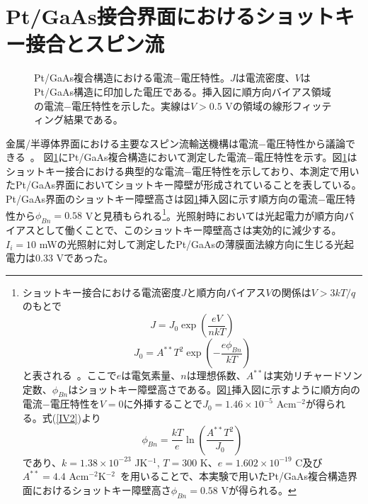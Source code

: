 \section{Pt/GaAs接合界面におけるショットキー接合とスピン流}






\begin{figure}[tbp]
\begin{center}
\caption{Pt/GaAs複合構造における電流−電圧特性。$J$は電流密度、$V$はPt/GaAs構造に印加した電圧である。挿入図に順方向バイアス領域の電流−電圧特性を示した。実線は$V>0.5$ Vの領域の線形フィッティング結果である。}
\label{current_voltage} 
\end{center}
\end{figure}


金属/半導体界面における主要なスピン流輸送機構は電流−電圧特性から議論できる~\cite{Padovani,Cohen,Sze}。
図\ref{current_voltage}にPt/GaAs複合構造において測定した電流−電圧特性を示す。図\ref{current_voltage}はショットキー接合における典型的な電流−電圧特性を示しており、本測定で用いたPt/GaAs界面においてショットキー障壁が形成されていることを表している。
Pt/GaAs界面のショットキー障壁高さは図\ref{current_voltage}挿入図に示す順方向の電流−電圧特性から$\phi_{Bn}=0.58$ Vと見積もられる\footnote{ショットキー接合における電流密度$J$と順方向バイアス$V$の関係は$V>3kT/q$のもとで
\begin{equation}
J=J_0\exp\left(\frac{eV}{nkT}\right)\label{IV}
\end{equation}
\begin{equation}
J_0=A^{**}T^2\exp \left(-\frac{e\phi_{Bn}}{kT}\right)\label{IV2}
\end{equation}
と表される~\cite{Sze,Cohen}。ここで$e$は電気素量、$n$は理想係数、$A^{**}$は実効リチャードソン定数、$\phi_{Bn}$はショットキー障壁高さである。図\ref{current_voltage}挿入図に示すように順方向の電流−電圧特性を$V=0$に外挿することで$J_0=1.46\times10^{-5}$ Acm$^{-2}$が得られる。式(\ref{IV2})より
\begin{equation}
\phi_{Bn}=\frac{kT}{e}\ln\left(\frac{A^{**}T^2}{J_0}\right)
\end{equation}
であり、$k=1.38\times10^{-23}$ JK$^{-1}$, $T=300$ K、$e=1.602\times 10^{-19}$ C及び$A^{**}=4.4$ Acm$^{-2}$K$^{-2}$~\cite{Sze}を用いることで、本実験で用いたPt/GaAs複合構造界面におけるショットキー障壁高さ$\phi_{Bn}=0.58$ Vが得られる。
}。光照射時においては光起電力が順方向バイアスとして働くことで、このショットキー障壁高さは実効的に減少する。$I_i=10$ mWの光照射に対して測定したPt/GaAsの薄膜面法線方向に生じる光起電力は0.33 Vであった。

